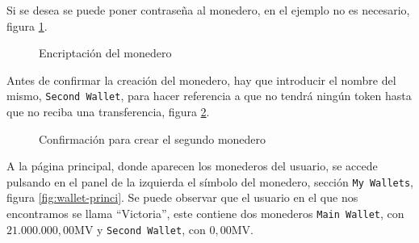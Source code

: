 Si se desea se puede poner contraseña al monedero, en el ejemplo no es necesario, figura \ref{fig:wallet-16}.\\

\begin{figure}[H]
	\centering
	\caption{Encriptación del monedero}
	\label{fig:wallet-16}
\end{figure}

\newpage

Antes de confirmar la creación del monedero, hay que introducir el nombre del mismo, \texttt{Second Wallet}, para hacer referencia a que no tendrá ningún token hasta que no reciba una transferencia, figura \ref{fig:wallet-17}.\\

\begin{figure}[H]
	\centering
	\caption{Confirmación para crear el segundo monedero}
	\label{fig:wallet-17}
\end{figure}

A la página principal, donde aparecen los monederos del usuario, se accede pulsando en el panel de la izquierda el símbolo del monedero, sección \texttt{My Wallets}, figura \ref{fig:wallet-princi}. Se puede observar que el usuario en el que nos encontramos se llama ``Victoria'', este contiene dos monederos \texttt{Main Wallet}, con $21.000.000,00$MV y \texttt{Second Wallet}, con $0,00$MV.\\

